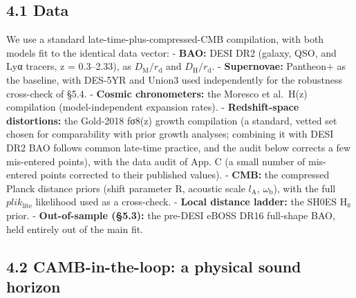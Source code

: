\documentclass[
  10pt,
]{article}
\begin{document}
\subsection{4.1 Data}\label{data}

We use a standard late-time-plus-compressed-CMB compilation, with both
models fit to the identical data vector: - \textbf{BAO:} DESI DR2
(galaxy, QSO, and Lyα tracers, z = 0.3--2.33), as
\(D_{\mathrm{M}}/r_{\mathrm{d}}\) and \(D_{\mathrm{H}}/r_{\mathrm{d}}\).
- \textbf{Supernovae:} Pantheon+ as the baseline, with DES-5YR and
Union3 used independently for the robustness cross-check of §5.4. -
\textbf{Cosmic chronometers:} the Moresco et al.~H(z) compilation
(model-independent expansion rates). - \textbf{Redshift-space
distortions:} the Gold-2018 fσ8(z) growth compilation (a standard,
vetted set chosen for comparability with prior growth analyses;
combining it with DESI DR2 BAO follows common late-time practice, and
the audit below corrects a few mis-entered points), with the data audit
of App. C (a small number of mis-entered points corrected to their
published values). - \textbf{CMB:} the compressed Planck distance priors
(shift parameter R, acoustic scale \(l_{\mathrm{A}}\),
\(\omega _{\mathrm{b}}\)), with the full \(plik_{\mathrm{lite}}\)
likelihood used as a cross-check. - \textbf{Local distance ladder:} the
SH0ES H₀ prior. - \textbf{Out-of-sample (§5.3):} the pre-DESI eBOSS DR16
full-shape BAO, held entirely out of the main fit.

\subsection{4.2 CAMB-in-the-loop: a physical sound
horizon}\label{camb-in-the-loop-a-physical-sound-horizon}
\end{document}
